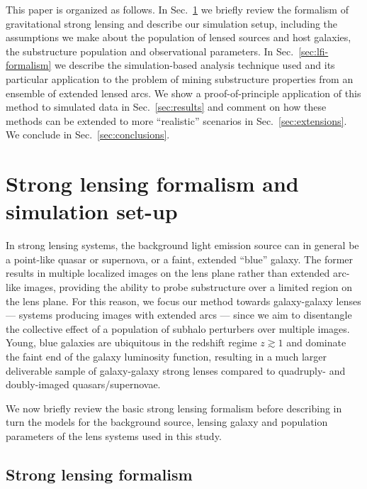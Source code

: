 \documentclass[twocolumn]{aastex62}
\begin{document}
This paper is organized as follows. In Sec.~\ref{sec:lensing-formalism} we briefly review the formalism of gravitational strong lensing and describe our simulation setup, including the assumptions we make about the population of lensed sources and host galaxies, the substructure population and observational parameters. In Sec.~\ref{sec:lfi-formalism} we describe the simulation-based analysis technique used and its particular application to the problem of mining substructure properties from an ensemble of extended lensed arcs. We show a proof-of-principle application of this method to simulated data in Sec.~\ref{sec:results} and comment on how these methods can be extended to more ``realistic'' scenarios in Sec.~\ref{sec:extensions}. We conclude in Sec.~\ref{sec:conclusions}.

\section{Strong lensing formalism and simulation set-up}
\label{sec:lensing-formalism}

In strong lensing systems, the background light emission source can in general be a point-like quasar or supernova, or a faint, extended ``blue'' galaxy. The former results in multiple localized images on the lens plane rather than extended arc-like images, providing the ability to probe substructure over a limited region on the lens plane. For this reason, we focus our method towards galaxy-galaxy lenses --- systems producing images with extended arcs --- since we aim to disentangle the collective effect of a population of subhalo perturbers over multiple images. Young, blue galaxies are ubiquitous in the redshift regime $z\gtrsim1$ and dominate the faint end of the galaxy luminosity function, resulting in a much larger deliverable sample of galaxy-galaxy strong lenses compared to quadruply- and doubly-imaged quasars/supernovae.

We now briefly review the basic strong lensing formalism before describing in turn the models for the background source, lensing galaxy and population parameters of the lens systems used in this study.

\subsection{Strong lensing formalism}
\end{document}
